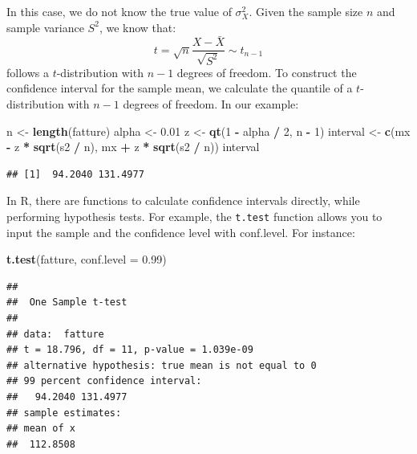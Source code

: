 \documentclass[
]{article}
\newenvironment{Shaded}{\begin{snugshade}}{\end{snugshade}}
\newcommand{\AttributeTok}[1]{\textcolor[rgb]{0.13,0.29,0.53}{#1}}
\newcommand{\DecValTok}[1]{\textcolor[rgb]{0.00,0.00,0.81}{#1}}
\newcommand{\FloatTok}[1]{\textcolor[rgb]{0.00,0.00,0.81}{#1}}
\newcommand{\FunctionTok}[1]{\textcolor[rgb]{0.13,0.29,0.53}{\textbf{#1}}}
\newcommand{\NormalTok}[1]{#1}
\newcommand{\OtherTok}[1]{\textcolor[rgb]{0.56,0.35,0.01}{#1}}
\newcommand{\SpecialCharTok}[1]{\textcolor[rgb]{0.81,0.36,0.00}{\textbf{#1}}}
\begin{document}
In this case, we do not know the true value of \(\sigma^2_X\). Given the
sample size \(n\) and sample variance \(S^2\), we know that:
\[t = \sqrt{n}\frac{X - \bar{X}}{\sqrt{S^2}} \sim t_{n-1}\] follows a
\(t\)-distribution with \(n-1\) degrees of freedom. To construct the
confidence interval for the sample mean, we calculate the quantile of a
\(t\)-distribution with \(n-1\) degrees of freedom. In our example:

\begin{Shaded}
\begin{Highlighting}[]
\NormalTok{n }\OtherTok{\textless{}{-}} \FunctionTok{length}\NormalTok{(fatture)}
\NormalTok{alpha }\OtherTok{\textless{}{-}} \FloatTok{0.01}
\NormalTok{z }\OtherTok{\textless{}{-}} \FunctionTok{qt}\NormalTok{(}\DecValTok{1} \SpecialCharTok{{-}}\NormalTok{ alpha }\SpecialCharTok{/} \DecValTok{2}\NormalTok{, n }\SpecialCharTok{{-}} \DecValTok{1}\NormalTok{)}
\NormalTok{interval }\OtherTok{\textless{}{-}} \FunctionTok{c}\NormalTok{(mx }\SpecialCharTok{{-}}\NormalTok{ z }\SpecialCharTok{*} \FunctionTok{sqrt}\NormalTok{(s2 }\SpecialCharTok{/}\NormalTok{ n), mx }\SpecialCharTok{+}\NormalTok{ z }\SpecialCharTok{*} \FunctionTok{sqrt}\NormalTok{(s2 }\SpecialCharTok{/}\NormalTok{ n))}
\NormalTok{interval}
\end{Highlighting}
\end{Shaded}

\begin{verbatim}
## [1]  94.2040 131.4977
\end{verbatim}

In R, there are functions to calculate confidence intervals directly,
while performing hypothesis tests. For example, the \texttt{t.test}
function allows you to input the sample and the confidence level with
conf.level. For instance:

\begin{Shaded}
\begin{Highlighting}[]
\FunctionTok{t.test}\NormalTok{(fatture, }\AttributeTok{conf.level =} \FloatTok{0.99}\NormalTok{)}
\end{Highlighting}
\end{Shaded}

\begin{verbatim}
## 
##  One Sample t-test
## 
## data:  fatture
## t = 18.796, df = 11, p-value = 1.039e-09
## alternative hypothesis: true mean is not equal to 0
## 99 percent confidence interval:
##   94.2040 131.4977
## sample estimates:
## mean of x 
##  112.8508
\end{verbatim}
\end{document}
